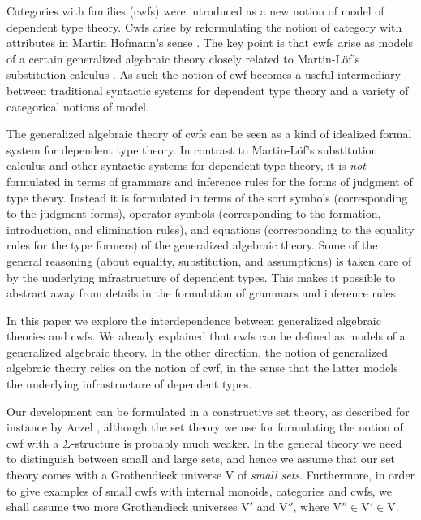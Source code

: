 \documentclass{mscs}
\def\V{\mathrm{V}}
\begin{document}
Categories with families (cwfs) \cite{dybjer:torino} were introduced as a new notion of model of dependent type theory. Cwfs arise by reformulating the notion of category with attributes in Martin Hofmann's sense \cite{hofmann:csl}. The key point is that cwfs arise as models of a certain generalized algebraic theory closely related to Martin-Löf's substitution calculus \cite{martinlof:gbg92}. As such the notion of cwf becomes a useful intermediary between traditional syntactic systems for dependent type theory and a variety of categorical notions of model.

The generalized algebraic theory of cwfs can be seen as a kind of idealized formal system for dependent type theory. In contrast to Martin-Löf's substitution calculus and other syntactic systems for dependent type theory, it is {\em not} formulated in terms of grammars and inference rules for the forms of judgment of type theory. Instead it is formulated in terms of the sort symbols (corresponding to the judgment forms), operator symbols (corresponding to the formation, introduction, and elimination rules), and equations (corresponding to the equality rules for the type formers) of the generalized algebraic theory. Some of the general reasoning (about equality, substitution, and assumptions) is taken care of by the underlying infrastructure of dependent types. This makes it possible to abstract away from details in the formulation of grammars and inference rules.

In this paper we explore the interdependence between generalized algebraic theories and cwfs. We already explained that cwfs can be defined as models of a generalized algebraic theory.
In the other direction, the notion of generalized algebraic theory relies on the notion of cwf, in the sense that the latter models the underlying infrastructure of dependent types.

Our development can be formulated in a constructive set theory,
as described for instance by Aczel \cite{MR519801,aczel:relate}, although the set theory
we use for formulating the notion of cwf with a $\Sigma$-structure is probably
much weaker. In the general theory we need to distinguish between small and large sets, and hence we assume that our set theory comes with a Grothendieck universe $\V$ of {\em small sets}. Furthermore, in order to give examples of small cwfs with internal monoids, categories and cwfs, we shall assume two more Grothendieck universes $\V'$ and $\V''$, where $\V''  \in \V' \in \V$.
\end{document}
